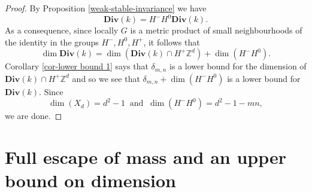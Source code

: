 \documentclass[reqno,11pt]{amsart}
\theoremstyle{plain}
\theoremstyle{definition}
\theoremstyle{remark}
\numberwithin{equation}{section}
\newcommand{\D}{\mathbf{Div}}
\newcommand{\Z}{{\mathbb{Z}}}
\begin{document}
\begin{proof}
By Proposition \ref{weak-stable-invariance} we have
\begin{equation*}
    \D(k) = H^- H^{0} \D(k).
\end{equation*}  
As a consequence, since locally $G$ is a metric product of small neighbourhoods of the identity
in the groups $H^-, H^0, H^+$, it follows that 
\begin{equation*}
    \dim \D(k) = \dim (\D(k) \cap H^+ \Z^d) + \dim (H^- H^0).
\end{equation*}
Corollary \ref{cor-lower bound 1} says that  $\delta_{m,n}$ is a lower bound for the dimension 
of $\D(k) \cap H^+ \Z^d$ and so we see that $\delta_{m,n} + \dim (H^{-} H^0)$ is a lower bound for $\D(k)$. Since 
\begin{equation*}
    \dim(X_d) = d^2 - 1\ \text{ and }\ \dim(H^-H^0) = d^2 - 1 - mn,
\end{equation*}
we are done.
\end{proof}

\section{Full escape of mass and an upper bound on dimension}
\end{document}
